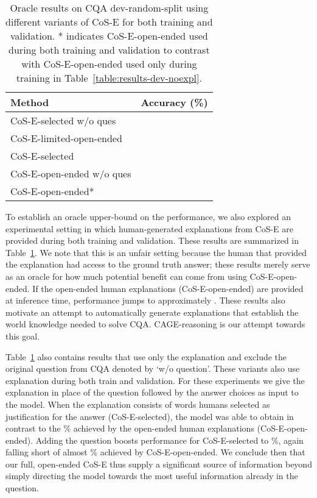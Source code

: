 \documentclass[11pt,a4paper]{article}
\begin{document}
\begin{table}[!t]
\centering
\small
\begin{tabular}{lc}
\toprule
\textbf{Method}&\textbf{Accuracy (\%)}\\
\midrule
CoS-E-selected w/o ques &\\
CoS-E-limited-open-ended &\\
CoS-E-selected &\\
CoS-E-open-ended w/o ques  & \\
CoS-E-open-ended*  &\\
\bottomrule
\end{tabular}
\caption{Oracle results on CQA dev-random-split using different variants of CoS-E for both training and validation. * indicates CoS-E-open-ended used during both training and validation to contrast with CoS-E-open-ended used only during training in Table~\ref{table:results-dev-noexpl}.}
\vspace{-0.4cm}
\begin{comment}
In these experiments, explanations were used for both train and validation and should not be considered fair comparisons to the results of Table~\ref{table:results-dev}. 
They merely demonstrate the results of our investigation into what makes effective explanation and serve as upper bounds (-ub) for variants of CAGE. 
\end{comment}
\label{table:results-dev}
\end{table}

To establish an oracle upper-bound on the performance, we also explored an experimental setting in which human-generated explanations from CoS-E are provided during both training and validation. 
These results are summarized in Table~\ref{table:results-dev}.
We note that this is an unfair setting because the human that provided the explanation had access to the ground truth answer;
these results merely serve as an oracle for how much potential benefit can come from using CoS-E-open-ended.
If the open-ended human explanations (CoS-E-open-ended) are provided at inference time, performance jumps to approximately .
 These results also motivate an attempt to automatically
generate explanations that establish the
world knowledge needed to solve CQA. CAGE-reasoning is our attempt towards this goal.



Table~\ref{table:results-dev} also contains results that use only the explanation and exclude the original question from CQA denoted by `w/o question'.
These variants also use explanation during both train and validation.
For these experiments we give the explanation in place of the question followed by the answer choices as input to the model. 
When the explanation consists of words humans selected as justification for the answer (CoS-E-selected), 
the model was able to obtain  in contrast to the \% achieved by the open-ended human explanations (CoS-E-open-ended).
Adding the question boosts performance for CoS-E-selected to \%, again falling short of almost \% achieved by CoS-E-open-ended. 
We conclude then that our full, open-ended CoS-E thus supply a significant source of information beyond simply directing the model towards the most useful information already in the question.
\end{document}
